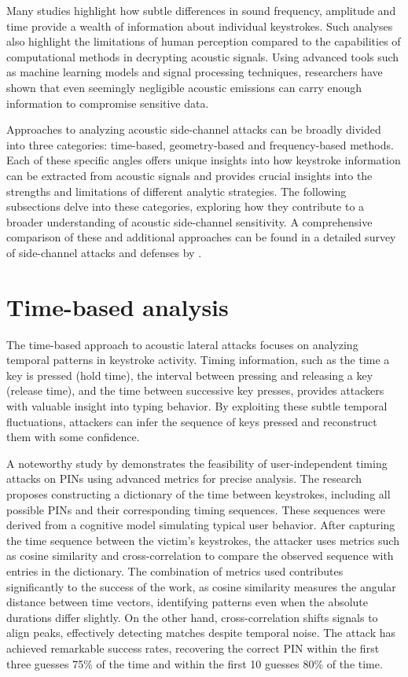 \documentclass[a4paper,11pt,twoside]{report}
\theoremstyle{definition}
\begin{document}
Many studies highlight how subtle differences in sound frequency, amplitude and time provide a wealth of information about individual keystrokes. Such analyses also highlight the limitations of human perception compared to the capabilities of computational methods in decrypting acoustic signals. Using advanced tools such as machine learning models and signal processing techniques, researchers have shown that even seemingly negligible acoustic emissions can carry enough information to compromise sensitive data.

Approaches to analyzing acoustic side-channel attacks can be broadly divided into three categories: time-based, geometry-based and frequency-based methods. Each of these specific angles offers unique insights into how keystroke information can be extracted from acoustic signals and provides crucial insights into the strengths and limitations of different analytic strategies. The following subsections delve into these categories, exploring how they contribute to a broader understanding of acoustic side-channel sensitivity. A comprehensive comparison of these and additional approaches can be found in a detailed survey of side-channel attacks and defenses by \textit{\cite{2023survey}}.

\section{Time-based analysis}

The time-based approach to acoustic lateral attacks focuses on analyzing temporal patterns in keystroke activity. Timing information, such as the time a key is pressed (hold time), the interval between pressing and releasing a key (release time), and the time between successive key presses, provides attackers with valuable insight into typing behavior. By exploiting these subtle temporal fluctuations, attackers can infer the sequence of keys pressed and reconstruct them with some confidence.

A noteworthy study by \textit{\cite{timebased}} demonstrates the feasibility of user-independent timing attacks on PINs using advanced metrics for precise analysis. The research proposes constructing a dictionary of the time between keystrokes, including all possible PINs and their corresponding timing sequences. These sequences were derived from a cognitive model simulating typical user behavior. After capturing the time sequence between the victim's keystrokes, the attacker uses metrics such as cosine similarity and cross-correlation to compare the observed sequence with entries in the dictionary.
The combination of metrics used contributes significantly to the success of the work, as cosine similarity measures the angular distance between time vectors, identifying patterns even when the absolute durations differ slightly. On the other hand, cross-correlation shifts signals to align peaks, effectively detecting matches despite temporal noise. The attack has achieved remarkable success rates, recovering the correct PIN within the first three guesses 75\% of the time and within the first 10 guesses 80\% of the time.
\end{document}
